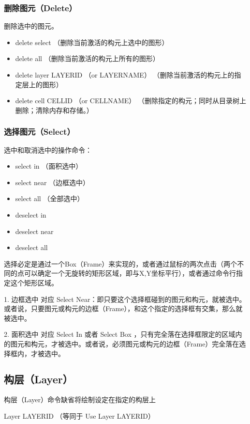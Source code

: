 \subsubsection{删除图元（Delete）} \label{SectCmdDelElem}
删除选中的图元。
\begin{itemize}
	\item delete select （删除当前激活的构元上选中的图形）
	\item delete all （删除当前激活的构元上所有的图形）
	\item delete layer LAYERID （or LAYERNAME） （删除当前激活的构元上的指定层上的图形）
	\item delete cell CELLID （or CELLNAME） （删除指定的构元；同时从目录树上删除；清除内存和存储。）
\end{itemize}

\subsubsection{选择图元（Select）} \label{SectCmdSelElem}
选中和取消选中的操作命令：
\begin{itemize}
	\item select in    （面积选中）
	\item select near  （边框选中）
	\item select all   （全部选中）
	\item deselect in
	\item deselect near
	\item deselect all
\end{itemize}

选择必定是通过一个Box（Frame）来实现的，或者通过鼠标的两次点击（两个不同的点可以确定一个无旋转的矩形区域，即与X,Y坐标平行），或者通过命令行指定这个矩形区域。

1. 边框选中 对应 Select Near：即只要这个选择框碰到的图元和构元，就被选中。或者说，只要图元或构元的边框（Frame），和这个指定的选择框有交集，那么就被选中。

2. 面积选中 对应 Select In 或者 Select Box ，只有完全落在选择框限定的区域内的图元和构元，才被选中。或者说，必须图元或构元的边框（Frame）完全落在选择框内，才被选中。

\subsection{构层（Layer）} \label{SectCmdLayer}
构层（Layer）命令缺省将绘制设定在指定的构层上

Layer LAYERID （等同于 Use Layer LAYERID）

